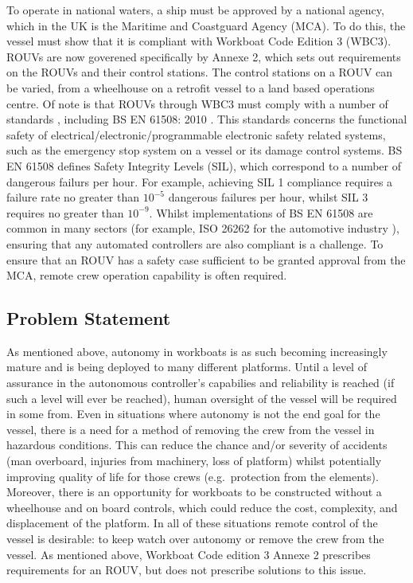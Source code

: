 \documentclass[../main.tex]{subfiles}
\begin{document}
To operate in national waters, a ship must be approved by a national agency, which in the UK is the Maritime and Coastguard Agency (MCA).
To do this, the vessel must show that it is compliant with Workboat Code Edition 3 (WBC3).
ROUVs are now goverened specifically by Annexe 2, which sets out requirements on the ROUVs and their control stations.
The control stations on a ROUV can be varied, from a wheelhouse on a retrofit vessel to a land based operations centre.
Of note is that ROUVs through WBC3 must comply with a number of standards \cite{MIN698}, including BS EN 61508: 2010 \cite{IEC61508}.
This standards concerns the functional safety of electrical/electronic/programmable electronic safety related systems, such as the emergency stop system on a vessel or its damage control systems.
BS EN 61508 defines Safety Integrity Levels (SIL), which correspond to a number of dangerous failurs per hour.
For example, achieving SIL 1 compliance requires a failure rate no greater than $10^{-5}$ dangerous failures per hour, whilst SIL 3 requires no greater than $10^{-9}$.
Whilst implementations of BS EN 61508 are common in many sectors (for example, ISO 26262 for the automotive industry \cite{ISO26262}), ensuring that any automated controllers are also compliant is a challenge.
To ensure that an ROUV has a safety case sufficient to be granted approval from the MCA, remote crew operation capability is often required.

\subsection{Problem Statement}\label{1.2}

As mentioned above, autonomy in workboats is as such becoming increasingly mature and is being deployed to many different platforms.
Until a level of assurance in the autonomous controller's capabilies and reliability is reached (if such a level will ever be reached), human oversight of the vessel will be required in some from.
Even in situations where autonomy is not the end goal for the vessel, there is a need for a method of removing the crew from the vessel in hazardous conditions.
This can reduce the chance and/or severity of accidents (man overboard, injuries from machinery, loss of platform) whilst potentially improving quality of life for those crews
(e.g.\ protection from the elements).
Moreover, there is an opportunity for workboats to be constructed without a wheelhouse and on board controls, which could reduce the cost, complexity, and displacement of the platform.
In all of these situations remote control of the vessel is desirable: to keep watch over autonomy or remove the crew from the vessel.
As mentioned above, Workboat Code edition 3 Annexe 2 \cite{WBC3} prescribes requirements for an ROUV, but does not prescribe solutions to this issue.
\end{document}
